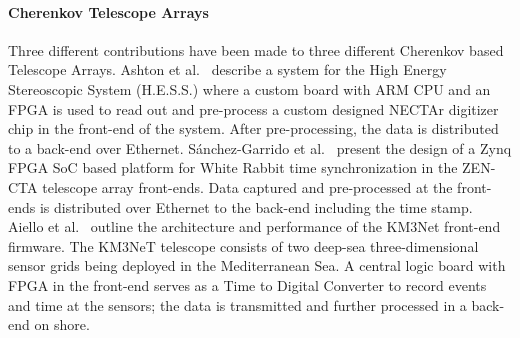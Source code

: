 \paragraph{Cherenkov Telescope Arrays}
Three different contributions have been made to three different Cherenkov based Telescope Arrays.
Ashton et al.~\cite{Ashton2020ATelescopes} describe a system for the High Energy Stereoscopic System (H.E.S.S.) where a custom board with ARM CPU and an FPGA is used to read out and pre-process a custom designed NECTAr digitizer chip in the front-end of the system. After pre-processing, the data is distributed to a back-end over Ethernet.
Sánchez-Garrido et al.~\cite{Sanchez-Garrido2021AArray} present the design of a Zynq FPGA SoC based platform for White Rabbit time synchronization in the ZEN-CTA telescope array front-ends. Data captured and pre-processed at the front-ends is distributed over Ethernet to the back-end including the time stamp.
Aiello et al.~\cite{Aiello2021ArchitectureFirmware} outline the architecture and performance of the KM3Net front-end firmware. The KM3NeT telescope consists of two deep-sea three-dimensional sensor grids being deployed in the Mediterranean Sea. A central logic board with FPGA in the front-end serves as a Time to Digital Converter to record events and time at the sensors; the data is transmitted and further processed in a back-end on shore.


